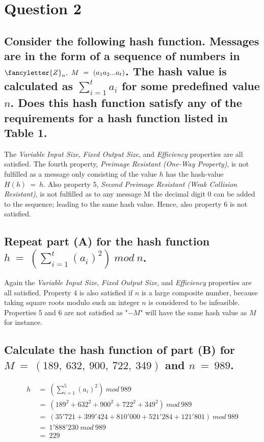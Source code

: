 \documentclass{report}
\begin{document}
	\section{Question 2}
	\startsection
		\renewcommand{\thesubsection}{\thesection.\Alph{subsection}}
		\subsection{Consider the following hash function. Messages are in the form of a sequence of numbers in $\fancyletter{Z}_n, \ M \ = \ (a_1a_2...a_t)$. The hash value is calculated as $\sum_{i=1}^t a_i$ for some predefined value $n$. Does this hash function satisfy any of the requirements for a hash function listed in Table 1.}
		\startsubsection
			The \textit{Variable Input Size}, \textit{Fixed Output Size}, and \textit{Efficiency} properties are all satisfied. The fourth property, \textit{Preimage Resistant (One-Way Property)}, is not fulfilled as a message only consisting of the value $h$ has the hash-value $H(h) \ = \ h$. Also property 5, \textit{Second Preimage Resistant (Weak Collision Resistant)}, is not fulfilled as to any message M the decimal digit $0$ can be added to the sequence; leading to the same hash value. Hence, also property 6 is not satisfied.
		\closesection
		\subsection{Repeat part (A) for the hash function $h \ = \ \left(\sum_{i=1}^t (a_i)^2\right) \ mod \ n$.}
		\startsubsection
			Again the \textit{Variable Input Size}, \textit{Fixed Output Size}, and \textit{Efficiency} properties are all satisfied. Property 4 is also satisfied if $n$ is a large composite number, because taking square roots modulo such an integer $n$ is considered to be infeasible. Properties 5 and 6 are not satisfied as "$-M$" will have the same hash value as $M$ for instance.
		\closesection
		\subsection{Calculate the hash function of part (B) for $M \ = \ (189, \ 632, \ 900, \ 722, \ 349)$ and $n \ = \ 989$.}
		\vspace*{-2em}
		\begin{align*}
			h \ & = \ \left(\sum_{i=1}^5 (a_i)^2\right) \ mod \ 989 \\
			& = \ (189^2 + 632^2 + 900^2 + 722^2 + 349^2) \ mod \ 989 \\
			& = \ (35'721 + 399'424 + 810'000 + 521'284 + 121'801) \ mod \ 989 \\
			& = \ 1'888'230 \ mod \ 989 \\
			& = \ 229
		\end{align*}
	\closesection
	
\end{document}
